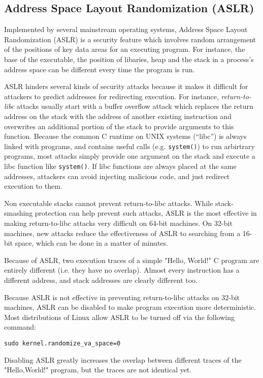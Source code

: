 \documentclass[11pt]{article} %
\begin{document}
\subsection{Address Space Layout Randomization (ASLR)}
Implemented by several mainstream operating systems, Address Space Layout Randomization (ASLR) is a security feature
which involves random arrangement of the positions of key data areas for an executing program. For instance, the 
base of the executable, the position of libaries, heap and the stack in a process's address space can be 
different every time the program is run.

ASLR hinders several kinds of security attacks because it makes it difficult for attackers to predict
addresses for redirecting execution. For instance, \emph{return-to-libc} attacks usually start with a buffer overflow attack
which replaces the return address on the stack with the address of another existing instruction and overwrites an additional
portion of the stack to provide arguments to this function. Because the common
C runtime on UNIX systems (``libc'') is always linked with programs, and contains useful calls (e.g. \texttt{system()})
to run arbirtrary programs, most attacks simply provide one argument on the stack and execute a libc function like \texttt{system()}.
If libc functions are always placed at the same addresses, attackers can avoid injecting malicious code,
and just redirect execution to them.

Non executable stacks cannot prevent return-to-libc attacks. While stack-smashing protection can help prevent
such attacks, ASLR is the most effective in making return-to-libc attacks very difficult on 64-bit machines. On 32-bit
machines, new attacks reduce the effectiveness of ASLR to searching from a 16-bit space, which can be
done in a matter of minutes.

Because of ASLR, two execution traces of a simple "Hello, World!" C program are entirely different (i.e. they
have no overlap). Almost every instruction has a different address, and stack addresses are clearly different too.

Because ASLR is not effective in preventing return-to-libc attacks on 32-bit machines, ASLR can be disabled
to make program execution more deterministic. Most distributions of Linux allow ASLR to be turned off via
the following command:

\texttt {sudo kernel.randomize\_va\_space=0}

Disabling ASLR greatly increases the overlap between different traces of the "Hello,World!" program,
but the traces are not identical yet.
\end{document}
